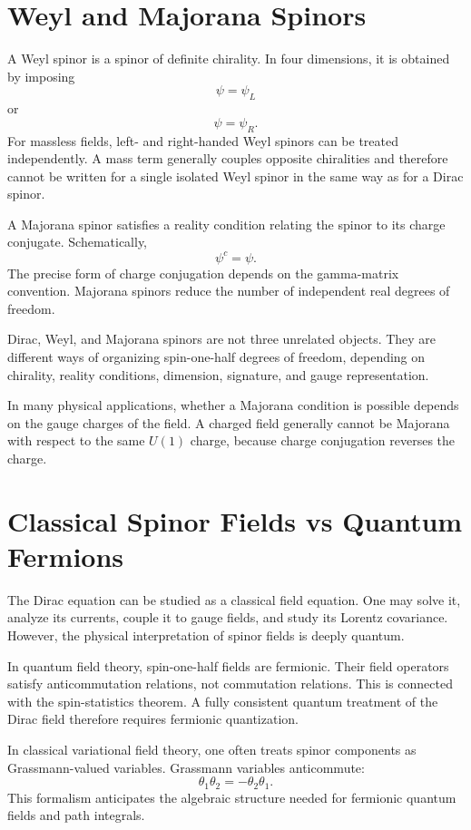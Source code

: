 \section{Weyl and Majorana Spinors}

A Weyl spinor is a spinor of definite chirality. In four dimensions, it is
obtained by imposing
\[
    \psi=\psi_L
\]
or
\[
    \psi=\psi_R.
\]
For massless fields, left- and right-handed Weyl spinors can be treated
independently. A mass term generally couples opposite chiralities and therefore
cannot be written for a single isolated Weyl spinor in the same way as for a
Dirac spinor.

A Majorana spinor satisfies a reality condition relating the spinor to its charge
conjugate. Schematically,
\[
    \psi^c=\psi.
\]
The precise form of charge conjugation depends on the gamma-matrix convention.
Majorana spinors reduce the number of independent real degrees of freedom.

\begin{remarkbox}
Dirac, Weyl, and Majorana spinors are not three unrelated objects. They are
different ways of organizing spin-one-half degrees of freedom, depending on
chirality, reality conditions, dimension, signature, and gauge representation.
\end{remarkbox}

In many physical applications, whether a Majorana condition is possible depends
on the gauge charges of the field. A charged field generally cannot be Majorana
with respect to the same \(U(1)\) charge, because charge conjugation reverses the
charge.

\section{Classical Spinor Fields vs Quantum Fermions}

The Dirac equation can be studied as a classical field equation. One may solve
it, analyze its currents, couple it to gauge fields, and study its Lorentz
covariance. However, the physical interpretation of spinor fields is deeply
quantum.

In quantum field theory, spin-one-half fields are fermionic. Their field
operators satisfy anticommutation relations, not commutation relations. This is
connected with the spin-statistics theorem. A fully consistent quantum treatment
of the Dirac field therefore requires fermionic quantization.

In classical variational field theory, one often treats spinor components as
Grassmann-valued variables. Grassmann variables anticommute:
\[
    \theta_1\theta_2=-\theta_2\theta_1.
\]
This formalism anticipates the algebraic structure needed for fermionic quantum
fields and path integrals.

